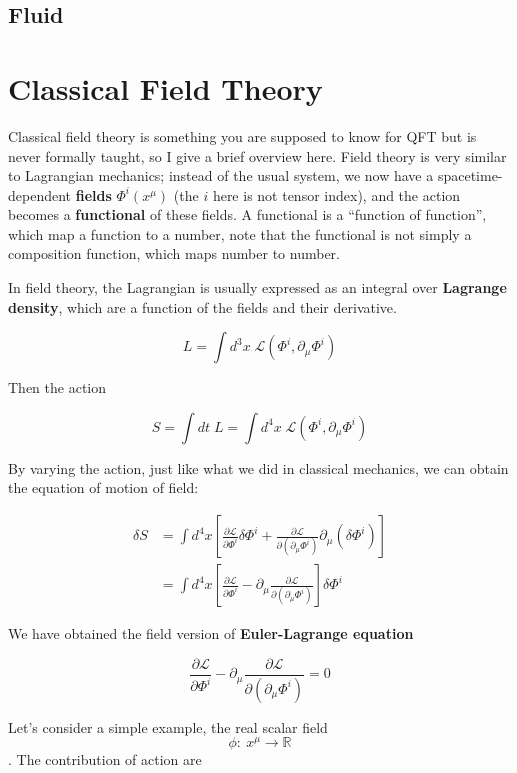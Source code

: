 \documentclass[12pt]{article}
\theoremstyle{mystyle}{\newtheorem{definition}{Definition}[subsection]}
\theoremstyle{mystyle}{\newtheorem{theorem}[definition]{Theorem}}
\theoremstyle{mystyle}{\newtheorem*{remark}{Remark}}
\theoremstyle{mystyle}{\newtheorem{example}{Example}[subsection]}
\theoremstyle{mystyle}{\newtheorem{examples}{Examples}[subsection]}
\theoremstyle{mystyle}{\newtheorem{cthm}{}[subsection]}
\begin{document}
\subsection{Fluid}

\newpage
\section{Classical Field Theory}
Classical field theory is something you are supposed to know for QFT but is never formally taught, so I give a brief overview here.
Field theory is very similar to Lagrangian mechanics; instead of the usual system,
we now have a spacetime-dependent \textbf{fields} \(\Phi^i(x^\mu)\) (the \(i\) here is not tensor index),
and the action becomes a \textbf{functional} of these fields. A functional is a ``function of function'', which map a function to a number,
note that the functional is not simply a composition function, which maps number to number. \par
In field theory, the Lagrangian is usually expressed as an integral over \textbf{Lagrange density},
which are a function of the fields and their derivative.
\begin{cthm}
  \[L=\int d^3x\;\mathcal{L}(\Phi^i,\partial_{\mu}\Phi^i)\]
\end{cthm}
Then the action
\begin{cthm}
  \[S=\int dt\;L = \int d^4x\;\mathcal{L}(\Phi^i,\partial_{\mu}\Phi^i)\]
\end{cthm}
By varying the action, just like what we did in classical mechanics, we can obtain the equation of motion of field:
\begin{cthm}
  \begin{align*}
    \delta S & = \int d^4x\left[\frac{\partial\mathcal{L}}{\partial \Phi^i}\delta\Phi^i+
    \frac{\partial\mathcal{L}}{\partial(\partial_\mu \Phi^i)}\partial_\mu (\delta\Phi^i)\right] \\
             & =\int d^4x\left[\frac{\partial\mathcal{L}}{\partial \Phi^i}-\partial_\mu
      \frac{\partial\mathcal{L}}{\partial(\partial_\mu \Phi^i)}\right]\delta\Phi^i
  \end{align*}
\end{cthm}
We have obtained the field version of \textbf{Euler-Lagrange equation}
\begin{cthm}
  \[\frac{\partial\mathcal{L}}{\partial \Phi^i}-\partial_\mu
    \frac{\partial\mathcal{L}}{\partial(\partial_\mu \Phi^i)}=0\]
\end{cthm}
Let's consider a simple example, the real scalar field \[\phi:\ x^{\mu} \rightarrow \mathbb{R}\].
The contribution of action are
\end{document}
